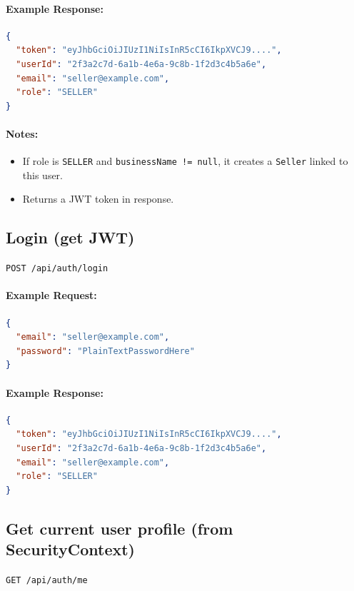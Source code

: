 \documentclass[a4paper,11pt]{article}
\begin{document}
\paragraph{Example Response:}
\begin{lstlisting}[language=json]
{
  "token": "eyJhbGciOiJIUzI1NiIsInR5cCI6IkpXVCJ9....",
  "userId": "2f3a2c7d-6a1b-4e6a-9c8b-1f2d3c4b5a6e",
  "email": "seller@example.com",
  "role": "SELLER"
}
\end{lstlisting}

\paragraph{Notes:}
\begin{itemize}
    \item If role is \texttt{SELLER} and \texttt{businessName != null}, it creates a \texttt{Seller} linked to this user.
    \item Returns a JWT token in response.
\end{itemize}

\subsection{Login (get JWT)}
\texttt{POST /api/auth/login}

\paragraph{Example Request:}
\begin{lstlisting}[language=json]
{
  "email": "seller@example.com",
  "password": "PlainTextPasswordHere"
}
\end{lstlisting}

\paragraph{Example Response:}
\begin{lstlisting}[language=json]
{
  "token": "eyJhbGciOiJIUzI1NiIsInR5cCI6IkpXVCJ9....",
  "userId": "2f3a2c7d-6a1b-4e6a-9c8b-1f2d3c4b5a6e",
  "email": "seller@example.com",
  "role": "SELLER"
}
\end{lstlisting}

\subsection{Get current user profile (from SecurityContext)}
\texttt{GET /api/auth/me}
\end{document}
